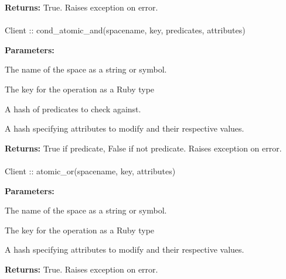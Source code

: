 \noindent\textbf{Returns:}
True.  Raises exception on error.

\paragraph{}
\begin{ccode}
Client :: cond_atomic_and(spacename, key, predicates, attributes)
\end{ccode}
\funcdesc 

\noindent\textbf{Parameters:}
\begin{description}[labelindent=\widthof{{\code{predicates}}},leftmargin=*,noitemsep,nolistsep,align=right]
\item[\code{spacename}] The name of the space as a string or symbol.
\item[\code{key}] The key for the operation as a Ruby type
\item[\code{predicates}] A hash of predicates to check against.
\item[\code{attributes}] A hash specifying attributes to modify and their respective values.
\end{description}

\noindent\textbf{Returns:}
True if predicate, False if not predicate.  Raises exception on error.

\paragraph{}
\begin{ccode}
Client :: atomic_or(spacename, key, attributes)
\end{ccode}
\funcdesc 

\noindent\textbf{Parameters:}
\begin{description}[labelindent=\widthof{{\code{attributes}}},leftmargin=*,noitemsep,nolistsep,align=right]
\item[\code{spacename}] The name of the space as a string or symbol.
\item[\code{key}] The key for the operation as a Ruby type
\item[\code{attributes}] A hash specifying attributes to modify and their respective values.
\end{description}

\noindent\textbf{Returns:}
True.  Raises exception on error.

